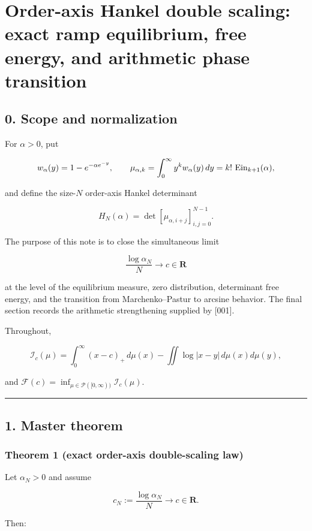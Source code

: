 \section{Order-axis Hankel double scaling: exact ramp equilibrium, free energy, and arithmetic phase transition}

\subsection{0. Scope and normalization}

For \(\alpha>0\), put

\[
w_\alpha(y)=1-e^{-\alpha e^{-y}},\qquad
\mu_{\alpha,k}=\int_0^\infty y^k w_\alpha(y)\,dy
=k!\,\operatorname{Ein}_{k+1}(\alpha),
\]

and define the size-\(N\) order-axis Hankel determinant

\[
H_N(\alpha)=\det[\mu_{\alpha,i+j}]_{i,j=0}^{N-1}.
\]

The purpose of this note is to close the simultaneous limit

\[
\frac{\log\alpha_N}{N}\longrightarrow c\in\mathbf R
\]

at the level of the equilibrium measure, zero distribution, determinant
free energy, and the transition from Marchenko--Pastur to arcsine behavior.
The final section records the arithmetic strengthening supplied by {[}001{]}.

Throughout,

\[
\mathcal I_c(\mu)
=\int_0^\infty (x-c)_+\,d\mu(x)
-\iint\log|x-y|\,d\mu(x)d\mu(y),
\]

and \(\mathcal F(c)=\inf_{\mu\in\mathcal P([0,\infty))}\mathcal I_c(\mu)\).

\begin{center}\rule{0.5\linewidth}{0.5pt}\end{center}

\subsection{1. Master theorem}

\subsubsection{Theorem 1 (exact order-axis double-scaling law)}

Let \(\alpha_N>0\) and assume

\[
c_N:=\frac{\log\alpha_N}{N}\longrightarrow c\in\mathbf R.
\]

Then:

